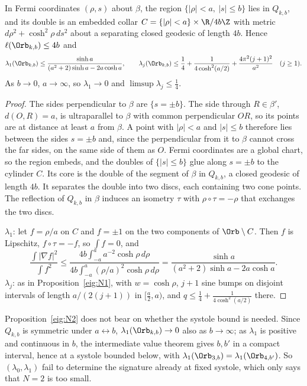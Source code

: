 \begin{proposition}[Pinching]\label{eig:N2}
In Fermi coordinates $(\rho,s)$ about $\beta$, the region $\{|\rho|<a,\ |s|\le b\}$ lies in $Q_{k,b}$, and its double is an embedded collar $C=\{|\rho|<a\}\times\R/4b\Z$ with metric $d\rho^2+\cosh^2\rho\,ds^2$ about a separating closed geodesic of length $4b$. Hence $\ell(\Orb_{k,b})\le4b$ and
\[
  \lambda_1(\Orb_{k,b})\le\frac{\sinh a}{(a^2+2)\sinh a-2a\cosh a},\qquad
  \lambda_j(\Orb_{k,b})\le\frac14+\frac1{4\cosh^2(a/2)}+\frac{4\pi^2(j+1)^2}{a^2}\quad(j\ge1).
\]
As $b\to0$, $a\to\infty$, so $\lambda_1\to0$ and $\limsup\lambda_j\le\frac14$.
\end{proposition}

\begin{proof}
The sides perpendicular to $\beta$ are $\{s=\pm b\}$. The side through $R\in\beta'$, $d(O,R)=a$, is ultraparallel to $\beta$ with common perpendicular $OR$, so its points are at distance at least $a$ from $\beta$. A point with $|\rho|<a$ and $|s|\le b$ therefore lies between the sides $s=\pm b$ and, since the perpendicular from it to $\beta$ cannot cross the far sides, on the same side of them as $O$. Fermi coordinates are a global chart, so the region embeds, and the doubles of $\{|s|\le b\}$ glue along $s=\pm b$ to the cylinder $C$. Its core is the double of the segment of $\beta$ in $Q_{k,b}$, a closed geodesic of length $4b$. It separates the double into two discs, each containing two cone points. The reflection of $Q_{k,b}$ in $\beta$ induces an isometry $\tau$ with $\rho\circ\tau=-\rho$ that exchanges the two discs.

$\lambda_1$: let $f=\rho/a$ on $C$ and $f=\pm1$ on the two components of $\Orb\setminus C$. Then $f$ is Lipschitz, $f\circ\tau=-f$, so $\int f=0$, and
\[
  \frac{\int|\nabla f|^2}{\int f^2}\le\frac{4b\int_{-a}^a a^{-2}\cosh\rho\,d\rho}{4b\int_{-a}^a(\rho/a)^2\cosh\rho\,d\rho}=\frac{\sinh a}{(a^2+2)\sinh a-2a\cosh a}.
\]
$\lambda_j$: as in Proposition~\ref{eig:N1}, with $w=\cosh\rho$, $j+1$ sine bumps on disjoint intervals of length $a/(2(j+1))$ in $[\frac a2,a)$, and $q\le\frac14+\frac1{4\cosh^2(a/2)}$ there. \end{proof}

Proposition~\ref{eig:N2} does not bear on whether the systole bound is needed. Since $Q_{k,b}$ is symmetric under $a\leftrightarrow b$, $\lambda_1(\Orb_{k,b})\to0$ also as $b\to\infty$; as $\lambda_1$ is positive and continuous in $b$, the intermediate value theorem gives $b,b'$ in a compact interval, hence at a systole bounded below, with $\lambda_1(\Orb_{3,b})=\lambda_1(\Orb_{4,b'})$. So $(\lambda_0,\lambda_1)$ fail to determine the signature already at fixed systole, which only says that $N=2$ is too small.

